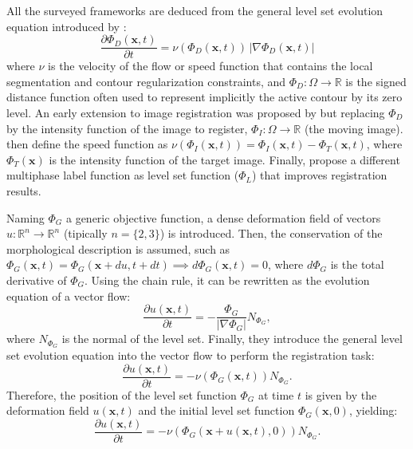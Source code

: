 All the surveyed frameworks are deduced from the general level set evolution equation
introduced by \citep{osher_fronts_1988}:
\begin{equation}
\frac{\partial \Phi_D(\mathbf{x},t)}{\partial t} = \nu ( \Phi_D(\mathbf{x},t)) \, \left| \nabla \Phi_D(\mathbf{x},t) \right|
\end{equation}
where $\nu$ is the velocity of the flow or speed function that contains the local
segmentation and contour regularization constraints, and $\Phi_D: \Omega \to \mathbb{R}$
is the signed distance function often used to represent implicitly the active contour
by its zero level. An early extension to image registration was proposed by 
\citep{vemuri_joint_2003} but replacing $\Phi_D$ by the intensity function of the
image to register, $\Phi_I: \Omega \to \mathbb{R}$ (the moving image). 
\citep{bertalmio_morphing_2000,vemuri_joint_2003} then define the speed function as
$\nu(\Phi_I(\mathbf{x},t)) = \Phi_I(\mathbf{x},t) - \Phi_T(\mathbf{x},t)$, where $\Phi_T(\mathbf{x})$ is the intensity
function of the target image. Finally, \citep{gorthi_active_2011} propose a different
multiphase label function as level set function ($\Phi_L$) that improves registration
results.

Naming $\Phi_G$ a generic objective function, a dense deformation field of vectors 
$u: \mathbb{R}^n \to \mathbb{R}^n$ (tipically $n = \{ 2, 3 \}$) is introduced. 
Then, the conservation of the morphological description is assumed, such as
$\Phi_G(\mathbf{x},t) = \Phi_G( \mathbf{x} + du, t + dt ) \implies d\Phi_G(\mathbf{x},t) = 0$, where $d\Phi_G$ is
the total derivative of $\Phi_G$. Using the chain rule, it can be rewritten as the 
evolution equation of a vector flow:
\begin{equation}
\frac{\partial u(\mathbf{x},t)}{\partial t}= - \frac{\Phi_G}{\left| \nabla \Phi_G \right|} N_{\Phi_G},
\end{equation}
where $N_{\Phi_G}$ is the normal of the level set. Finally, they introduce the general
level set evolution equation into the vector flow to perform the registration task:
\begin{equation}
\frac{\partial u(\mathbf{x},t)}{\partial t} = - \nu( \Phi_G(\mathbf{x},t) ) N_{\Phi_G}.
\end{equation}
Therefore, the position of the level set function $\Phi_G$ at time $t$ is given by the
deformation field $u(\mathbf{x},t)$ and the initial level set function $\Phi_G(\mathbf{x},0)$, yielding:
\begin{equation}
\frac{\partial u(\mathbf{x},t)}{\partial t} = - \nu( \Phi_G(\mathbf{x} + u(\mathbf{x},t), 0) ) N_{\Phi_G}.
\end{equation}

